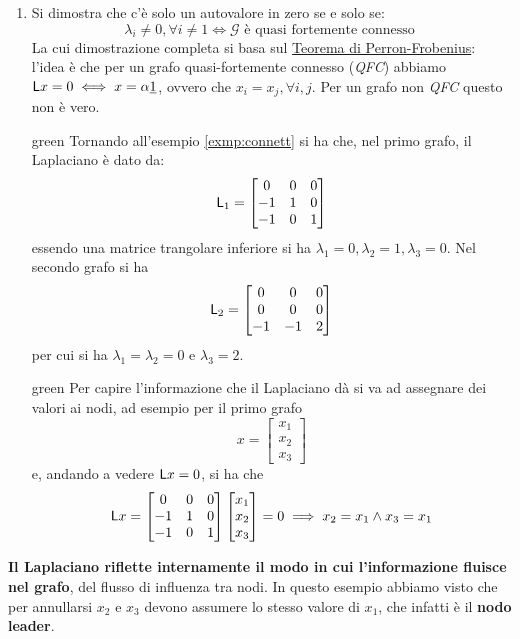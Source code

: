 \begin{enumerate}
\begin{tcolorbox}
  \end{tcolorbox}
\item  Si dimostra che c'\`e solo un autovalore in zero se e solo se: 
   \[
   \lambda_i \neq 0, \forall i \neq 1 \iff \mathcal{G} \text{ \`e quasi fortemente connesso }
   \]
  La cui dimostrazione completa si basa sul \href{https://en.wikipedia.org/wiki/Perron%E2%80%93Frobenius_theorem}{Teorema di Perron-Frobenius}: 
  l'idea \`e che per un grafo quasi-fortemente connesso (\textit{QFC}) abbiamo $\mathsf{L} x = 0 \iff x = \alpha \underline{1}$, ovvero che $x_i = x_j, \forall i,j$. Per un grafo non \textit{QFC} questo non \`e vero. 
  \begin{mybox}{green}{}
  Tornando all'esempio \ref{exmp:connett} si ha che, nel primo grafo, il Laplaciano è dato da:
  \[
  \mathsf{L}_1 = \begin{bmatrix}
  0 & 0 & 0 \\
  -1 & 1 & 0 \\
  -1 & 0 & 1
  \end{bmatrix}
  \]
  essendo una matrice trangolare inferiore si ha $\lambda_1 = 0, \lambda_2 = 1, \lambda_3 = 0$. Nel secondo grafo si ha
  \[
  \mathsf{L}_2 = \begin{bmatrix}
  0 & 0 & 0 \\
  0 & 0 & 0 \\
  -1 & -1 & 2
  \end{bmatrix}
  \]
  per cui si ha $\lambda_1 = \lambda_2 = 0$ e $\lambda_3 = 2$.
  \end{mybox}
  \begin{mybox}{green}{}
  Per capire l'informazione che il Laplaciano d\`a si va ad assegnare dei valori ai nodi, ad esempio per il primo grafo
  \begin{equation*}
    x = \begin{bmatrix}
    x_1 \\
    x_2 \\
    x_3
    \end{bmatrix}
  \end{equation*}
  e, andando a vedere $\mathsf{L} x = 0$, si ha che
  \begin{equation*} \mathsf{L} x =
  \begin{bmatrix}
  0 & 0 & 0 \\
  -1 & 1 & 0 \\
  -1 & 0 & 1
  \end{bmatrix} \begin{bmatrix}
  x_1 \\
  x_2 \\
  x_3
  \end{bmatrix} = 0 \implies x_2 = x_1 \land x_3 = x_1
  \end{equation*}
  \end{mybox}
  \end{enumerate}

\textbf{Il Laplaciano riflette internamente il modo in cui l'informazione fluisce nel grafo}, del flusso di influenza tra nodi. In questo esempio abbiamo visto che per annullarsi $x_2$ e $x_3$ devono assumere lo stesso valore di $x_1$, che infatti \`e il \textbf{nodo leader}.
